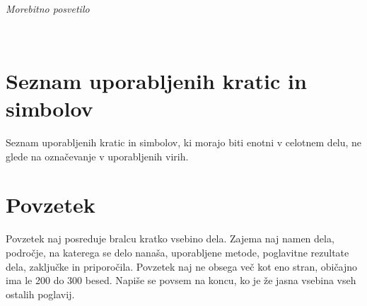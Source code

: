 \documentclass[12pt,a4paper]{book}
\begin{document}
\ \thispagestyle{empty}

\newpage


\thispagestyle{empty}

$\;$ 

\vspace{5cm}
\hfill {\Large \em Morebitno posvetilo}
\thispagestyle{empty}

\newpage



\ \thispagestyle{empty}

\newpage


\renewcommand\thepage{} 
\tableofcontents 
\renewcommand\thepage{\arabic{page}}

\thispagestyle{empty}



\chapter*{Seznam uporabljenih kratic in simbolov}

\thispagestyle{empty}

Seznam uporabljenih kratic in simbolov, ki morajo biti enotni v celotnem delu, ne glede na označevanje v uporabljenih virih.


\clearpage{\pagestyle{empty}\cleardoublepage}


\setcounter{page}{1}

\chapter*{Povzetek}


Povzetek naj posreduje bralcu kratko vsebino dela. Zajema naj namen dela, področje, na katerega se delo nanaša,
uporabljene metode, poglavitne rezultate dela, zaključke in priporočila. 
Povzetek naj ne obsega več kot eno stran, obi\v cajno ima le 200 do 300 besed. Napiše se povsem na koncu,
ko je že jasna vsebina vseh ostalih poglavij.
\end{document}
